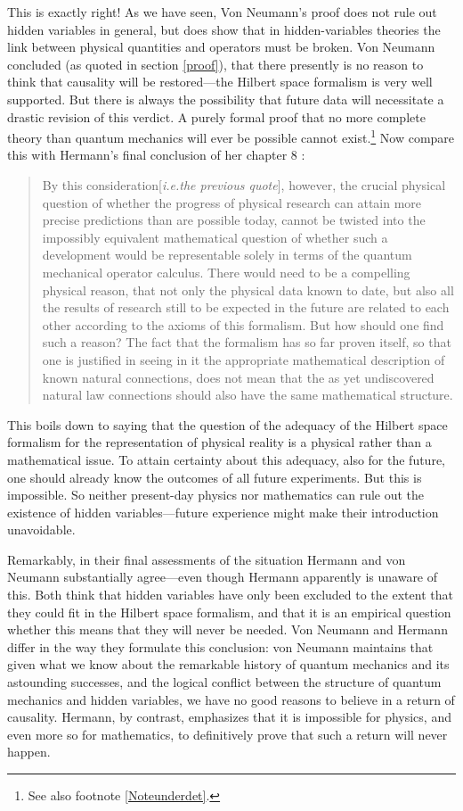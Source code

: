 \documentclass[11pt]{article}
\begin{document}
This is exactly right! As we have seen, Von Neumann's proof does not rule out hidden variables in general, but does show that in hidden-variables theories the link between physical quantities and operators must be broken. Von Neumann concluded (as quoted in section \ref{proof}), that there presently is no reason to think that causality will be restored---the Hilbert space formalism is very well supported. But there is always the possibility that future data will necessitate a drastic revision of this verdict. A purely formal proof that no more complete theory than quantum mechanics will ever be possible cannot exist.\footnote{See also footnote \ref{Noteunderdet}.} Now compare this with Hermann's final conclusion of her chapter 8 \cite[p.\@ 270]{crull}:
\begin{quote}
By this consideration[\emph{i.e.\@ the previous quote}], however, the crucial physical question of whether the
progress of physical research can attain more precise predictions than are possible
today, cannot be twisted into the impossibly equivalent mathematical question of
whether such a development would be representable solely in terms of the quantum
mechanical operator calculus. There would need to be a compelling physical reason,
that not only the physical data known to date, but also all the results of research still
to be expected in the future are related to each other according to the axioms of
this formalism. But how should one find such a reason? The fact that the formalism
has so far proven itself, so that one is justified in seeing in it the appropriate
mathematical description of known natural connections, does not mean that the as
yet undiscovered natural law connections should also have the same mathematical
structure.
\end{quote}

This boils down to saying that the question of the adequacy of the Hilbert space formalism for the representation of physical reality is a physical rather than a mathematical issue. To attain certainty about this adequacy, also for the future, one should already know the outcomes of all future experiments. But this is impossible. So neither present-day physics nor mathematics can rule out the existence of hidden variables---future experience might make their introduction unavoidable.

Remarkably, in their final assessments of the situation Hermann and von Neumann substantially agree---even though Hermann apparently is unaware of this. Both think that hidden variables have only been excluded to the extent that they could fit in the Hilbert space formalism, and that it is an empirical question whether this means that they will never be needed. Von Neumann and Hermann differ in the way they formulate this conclusion: von Neumann maintains that given what we know about the remarkable history of quantum mechanics and its astounding successes, and the logical conflict between the structure of quantum mechanics and hidden variables, we have no good reasons to believe in a return of causality. Hermann, by contrast, emphasizes that it is impossible for physics, and even more so for mathematics, to definitively prove that such a return will never happen.
\end{document}
